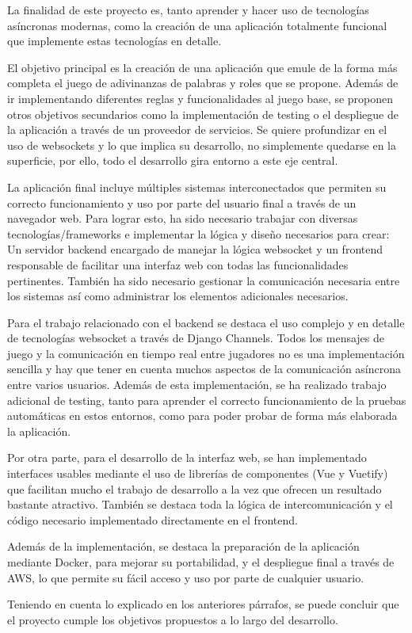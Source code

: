La finalidad de este proyecto es, tanto aprender y hacer uso de tecnologías
asíncronas modernas, como la creación de una aplicación totalmente funcional 
que implemente estas tecnologías en detalle.

El objetivo principal es la creación de una aplicación que emule de la forma más
completa el juego de adivinanzas de palabras y roles que se propone. Además de ir implementando
diferentes reglas y funcionalidades al juego base, se proponen otros objetivos secundarios
como la implementación de testing o el despliegue de la aplicación a través de un proveedor de 
servicios. Se quiere profundizar en el uso de websockets y lo que implica su desarrollo, no
simplemente quedarse en la superficie, por ello, todo el desarrollo gira entorno a este eje
central. 

La aplicación final incluye múltiples sistemas interconectados que permiten su correcto
funcionamiento y uso por parte del usuario final a través de un navegador web. Para lograr esto, 
ha sido necesario trabajar con diversas tecnologías/frameworks e implementar la lógica y diseño 
necesarios para crear: Un servidor backend encargado de manejar la lógica websocket y un frontend
responsable de facilitar una interfaz web con todas las funcionalidades pertinentes. 
También ha sido necesario gestionar la comunicación necesaria entre los sistemas así como administrar
los elementos adicionales necesarios.

Para el trabajo relacionado con el backend se destaca el uso complejo y en detalle de tecnologías
websocket a través de Django Channels. Todos los mensajes de juego y la comunicación en tiempo real
entre jugadores no es una implementación sencilla y hay que tener en cuenta muchos 
aspectos de la comunicación asíncrona entre varios usuarios. Además de esta implementación,
se ha realizado trabajo adicional de testing, tanto para aprender el correcto funcionamiento 
de la pruebas automáticas en estos entornos, como para poder probar de forma más 
elaborada la aplicación.

Por otra parte, para el desarrollo de la interfaz web, se han implementado interfaces
usables mediante el uso de librerías de componentes (Vue y Vuetify) que facilitan mucho el trabajo de desarrollo
a la vez que ofrecen un resultado bastante atractivo. También se destaca toda la lógica de
intercomunicación y el código necesario implementado directamente en el frontend.

Además de la implementación, se destaca la preparación de la aplicación mediante Docker, 
para mejorar su portabilidad, y el despliegue final a través de AWS, 
lo que permite su fácil acceso y uso por parte de cualquier usuario.

Teniendo en cuenta lo explicado en los anteriores párrafos, se puede concluir
que el proyecto cumple los objetivos propuestos a lo largo del desarrollo.